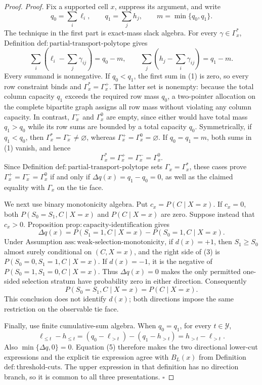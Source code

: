 \documentclass{article}
\begin{document}
\begin{proof}
\noindent\textit{Proof.}
Fix a supported cell \(x\), suppress its argument, and write
\[
q_0=\sum_i\ell_i,\qquad q_1=\sum_jh_j,
\qquad m=\min\{q_0,q_1\}.
\]
The technique in the first part is exact-mass slack algebra.  For every
\(\gamma\in\Gamma_x^{\ast}\), Definition
\(\mathrm{def{:}partial\text{-}transport\text{-}polytope}\) gives
\[
\sum_i\left(\ell_i-\sum_j\gamma_{ij}\right)=q_0-m,
\qquad
\sum_j\left(h_j-\sum_i\gamma_{ij}\right)=q_1-m.
\tag{1}
\]
Every summand is nonnegative.  If \(q_0<q_1\), the first sum in (1) is
zero, so every row constraint binds and
\(\Gamma_x^{\ast}=\Gamma_x^{+}\).  The latter set is nonempty: because
the total column capacity \(q_1\) exceeds the required row mass \(q_0\),
a two-pointer allocation on the complete bipartite graph assigns all row
mass without violating any column capacity.  In contrast,
\(\Gamma_x^{-}\) and \(\Gamma_x^{0}\) are empty, since either would have
total mass \(q_1>q_0\) while its row sums are bounded by a total capacity
\(q_0\).  Symmetrically, if \(q_1<q_0\), then
\(\Gamma_x^{\ast}=\Gamma_x^{-}\ne\varnothing\), whereas
\(\Gamma_x^{+}=\Gamma_x^{0}=\varnothing\).  If \(q_0=q_1=m\), both
sums in (1) vanish, and hence
\[
\Gamma_x^{\ast}=\Gamma_x^{+}=\Gamma_x^{-}=\Gamma_x^{0}.
\tag{2}
\]
Since Definition \(\mathrm{def{:}partial\text{-}transport\text{-}polytope}\)
sets \(\Gamma_x=\Gamma_x^{\ast}\), these cases prove
\(\Gamma_x^{+}=\Gamma_x^{-}=\Gamma_x^{0}\) if and only if
\(\Delta q(x)=q_1-q_0=0\), as well as the claimed equality with
\(\Gamma_x\) on the tie face.

We next use binary monotonicity algebra.  Put
\(c_x=P(C\mid X=x)\).  If \(c_x=0\), both
\(P(S_0=S_1,C\mid X=x)\) and \(P(C\mid X=x)\) are zero.  Suppose instead
that \(c_x>0\).  Proposition
\(\mathrm{prop{:}capacity\text{-}identification}\) gives
\[
\Delta q(x)=P(S_1=1,C\mid X=x)-P(S_0=1,C\mid X=x).
\tag{3}
\]
Under Assumption \(\mathrm{ass{:}weak\text{-}selection\text{-}monotonicity}\),
if \(d(x)=+1\), then \(S_1\ge S_0\) almost surely conditional on
\((C,X=x)\), and the right side of (3) is
\(P(S_0=0,S_1=1,C\mid X=x)\).  If \(d(x)=-1\), it is the negative of
\(P(S_0=1,S_1=0,C\mid X=x)\).  Thus \(\Delta q(x)=0\) makes the only
permitted one-sided selection stratum have probability zero in either
direction.  Consequently
\[
P(S_0=S_1,C\mid X=x)=P(C\mid X=x).
\tag{4}
\]
This conclusion does not identify \(d(x)\); both directions impose the
same restriction on the observable tie face.

Finally, use finite cumulative-sum algebra.  When \(q_0=q_1\), for every
\(t\in\mathcal Y\),
\[
\ell_{\le t}-h_{\le t}
=(q_0-\ell_{>t})-(q_1-h_{>t})
=h_{>t}-\ell_{>t}.
\tag{5}
\]
Also \(\min\{\Delta q,0\}=0\).  Equation (5) therefore makes the two
directional lower-cut expressions and the explicit tie expression agree
with \(B_L(x)\) from Definition \(\mathrm{def{:}threshold\text{-}cuts}\).
The upper expression in that definition has no direction branch, so it is
common to all three presentations. \(\square\)
\end{proof}
\end{document}
